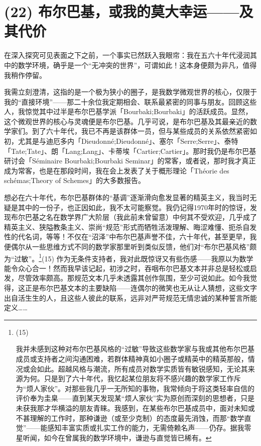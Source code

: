 \section{(22) 布尔巴基，或我的莫大幸运——及其代价}

在深入探究可见表面之下之前，一个事实已然跃入我眼帘：我在五六十年代浸润其中的数学环境，确乎是一个“无冲突的世界”，可谓如此！这本身便颇为非凡，值得我稍作停留。

我需立刻澄清，这指的是一个极为狭小的圈子，是我数学微观世界的核心，仅限于我的“直接环境”——那二十余位我定期相会、联系最紧密的同事与朋友。回顾这些人，我惊觉其中过半是布尔巴基学派「Bourbaki;Bourbaki」的活跃成员。显然，这个微观世界的核心与灵魂便是布尔巴基。几乎可说，是布尔巴基及其最亲近的数学家们。到了六十年代，我已不再是该群体一员，但与某些成员的关系依然紧密如初，尤其是与迪厄多内「Dieudonné;Dieudonné」、塞尔「Serre;Serre」、泰特「Tate;Tate」、朗「Lang;Lang」、卡蒂埃「Cartier;Cartier」。那时我仍是布尔巴基研讨会「Séminaire Bourbaki;Bourbaki Seminar」的常客，或者说，那时我才真正成为常客，也是在那段时间，我在会上发表了关于概形理论「Théorie des schémas;Theory of Schemes」的大多数报告。

想必在六十年代，布尔巴基群体的“基调”逐渐滑向愈发显著的精英主义，我当时无疑是其中的一份子，也正因如此，我不太可能察觉。我仍记得1970年时的惊讶，发现布尔巴基之名在数学界广大阶层（我此前未曾留意）中何其不受欢迎，几乎成了精英主义、狭隘教条主义、崇尚“规范”形式而牺牲活泼理解、晦涩难懂、扼杀自发性的代名词，等等！不仅在“沼泽”中布尔巴基声誉不佳，六十年代，甚至更早，我便偶尔从一些思维方式不同的数学家那里听到类似反馈，他们对“布尔巴基风格”颇为“过敏”。\footnote{(15)\par 我并未感到这种对布尔巴基风格的“过敏”导致这些数学家与我或其他布尔巴基成员或支持者之间沟通困难，若群体精神真如小圈子或精英中的精英那般，情况或会如此。超越风格与潮流，所有成员对数学实质皆有敏锐感知，无论其来源为何。只是到了六十年代，我忆起某位朋友将不感兴趣的数学家工作斥为“烦人家伙”。对那些我几乎一无所知的事物，我常倾向于将这类轻率自信的评价奉为圭臬——直到某天发现某“烦人家伙”实为原创而深刻的思想者，只是未获我那才华横溢的朋友青睐。我感到，在某些布尔巴基成员中，面对未知或不甚理解的工作时，那种谦逊（或至少克制）的态度最先消蚀，而那“数学直觉”——能感知丰富实质或扎实工作的能力，无需倚赖名声——仍存。据我零星听闻，如今在曾属我的数学环境中，谦逊与直觉皆已稀有。}(15) 作为无条件支持者，我对此既惊讶又有些伤感——我原以为数学能令众心合一！然而我早该记起，初涉之时，吞咽布尔巴基文本并非总是轻松或启发，尽管效率颇高。那规范文本几乎未透露其创作氛围，至少可说如此。如今我觉得，这正是布尔巴基文本的主要缺陷——连偶尔的微笑也无从让人猜想，这些文字出自活生生的人，且这些人彼此的联系，远非对严苛规范无情忠诚的某种誓言所能定义……

